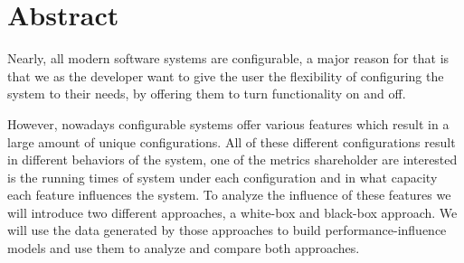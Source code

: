 \begingroup
\let\clearpage\relax
\let\cleardoublepage\relax
\let\cleardoublepage\relax

\chapter*{Abstract}
Nearly, all modern software systems are configurable, a major reason for that is that we as the developer 
want to give the user the flexibility of configuring the system to their needs, by offering them to turn functionality on and off. 

However, nowadays configurable systems offer various features which result in a large amount of unique configurations. All of these different
configurations result in different behaviors of the system, one of the metrics shareholder are interested 
is the running times of system under each configuration and in what capacity each feature influences
the system. To analyze the influence of these features we will introduce two different approaches, a white-box and black-box
approach. We will use the data generated by those approaches to build performance-influence models and use them to analyze and compare both
approaches. 

\vfill

\endgroup

\vfill
